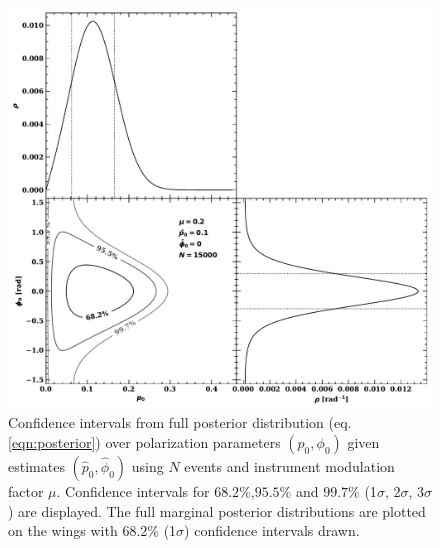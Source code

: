 \begin{figure}[t]
\centering
\includegraphics[scale=.5]{figures/contours.pdf}
\caption{Confidence intervals from full posterior distribution (eq.\ref{eqn:posterior}) over polarization parameters $(p_0, \phi_0)$ given estimates $(\hat{p}_0, \hat{\phi}_0)$ using $N$ events and instrument modulation factor $\mu$. 
Confidence intervals for $68.2\%$,$95.5\%$ and $99.7\%$ (1$\sigma$, $2\sigma$, $3\sigma$) are displayed.
The full marginal posterior distributions are plotted on the wings with $68.2\%$ (1$\sigma$) confidence intervals drawn. }
\label{fig:post}       %
\end{figure}


